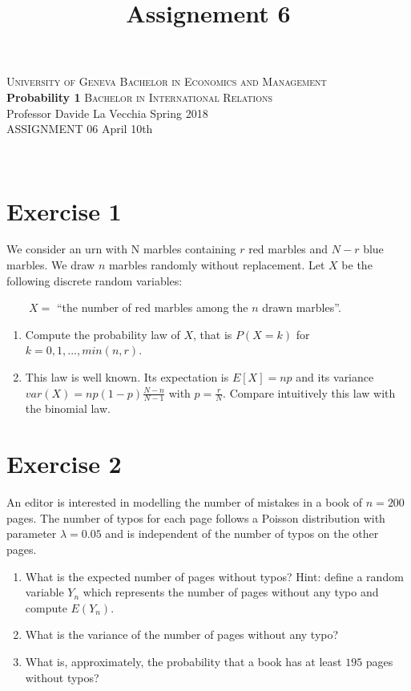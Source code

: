 \documentclass[12pt,thmsa]{article}
\title{Assignement 6}
\begin{document}
\noindent \textsc{University of Geneva}     \hfill \textsc{Bachelor in Economics and Management} \\
\textbf{Probability 1}                      \hfill \textsc{Bachelor in International Relations} \\
Professor Davide La Vecchia                 \hfill Spring 2018  \\
ASSIGNMENT 06                               \hfill   April 10th



\noindent
\makebox[\linewidth]{\rule{\textwidth}{0.4pt}}\\[1.5ex]


\section*{Exercise 1}

We consider an urn with N marbles containing $r$ red marbles and $N-r$ blue marbles. We draw $n$ marbles randomly without replacement.
Let $X$ be the following discrete random variables:

$ \qquad X=$ ``the number of red marbles among the $n$ drawn marbles''.

\begin{enumerate}
  \item Compute the probability law of $X$, that is $P(X=k)$ for $k=0,1,...,min(n,r)$.
  \item This law is well known. Its expectation is $E[X]=np$ and its variance $var(X)=np(1-p)\frac{N-n}{N-1}$ with $p=\frac{r}{N}$.
  Compare intuitively this law with the binomial law.
\end{enumerate}


\section*{Exercise 2}

An editor is interested in modelling the number of mistakes in a book of $n=200$ pages. The number of typos for each page follows a Poisson distribution
with parameter $\lambda=0.05$ and is independent of the number of typos on the other pages.
\begin{enumerate}
  \item What is the expected number of pages without typos? \newline
  Hint: define a random variable $Y_n$ which represents the number of pages without any typo and compute $E(Y_n)$.
  \item What is the variance of the number of pages without any typo?
  \item What is, approximately, the probability that a book has at least $195$ pages without typos? %
\end{enumerate}
\end{document}
